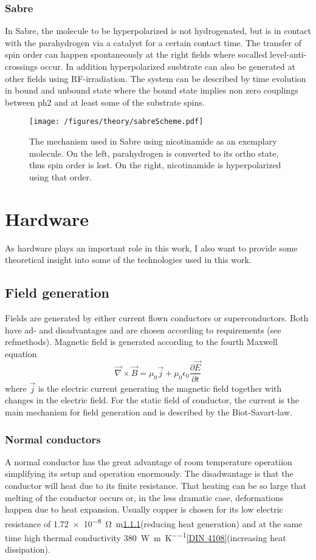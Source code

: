         \subsubsection{Sabre}
        In Sabre, the molecule to be hyperpolarized is not hydrogenated, but is in contact with the parahydrogen via a catalyst for a certain contact time. The transfer of spin order can happen spontaneously at the right fields where socalled level-anti-crossings occur. In addition hyperpolarized susbtrate can also be generated at other fields using RF-irradiation. The system can be described by time evolution in bound and unbound state where the bound state implies non zero couplings between ph2 and at least some of the substrate spins.
        \begin{figure}
            \centering
            \texttt{[image: /figures/theory/sabreScheme.pdf]}
            \caption[Sabre scheme]{The mechanism used in Sabre using nicotinamide as an exemplary molecule. On the left, parahydrogen is converted to its ortho state, thus spin order is lost. On the right, nicotinamide is hyperpolarized using that order.}
        \end{figure}
        \section{Hardware}
            As hardware plays an important role in this work, I also want to provide some theoretical insight into some of the technologies used in this work.
            \subsection{Field generation}
                Fields are generated by either current flown conductors or superconductors. Both have ad- and disadvantages and are chosen according to requirements (see ref{methods}). Magnetic field is generated according to the fourth Maxwell equation
                \begin{equation}
                    \vec\nabla\times\vec B = \mu_0\vec j+\mu_0\epsilon_0\frac{\partial\vec E}{\partial t}
                \end{equation}
                where $\vec j$ is the electric current generating the magnetic field together with changes in the electric field. For the static field of conductor, the current is the main mechanism for field generation and is described by the Biot-Savart-law.
                \subsubsection{Normal conductors}
                A normal conductor has the great advantage of room temperature operatiion simplifying its setup and operation enormously. The disadwantage is that the conductor will heat due to its finite resistance. That heating can be so large that melting of the conductor occurs or, in the less dramatic case, deformations happen due to heat expansion. Usually copper is chosen for its low electric resistance of \SI{1.72e-8}{\ohm\meter}\ref{}(reducing heat generation) and at the same time high thermal conductivity \SI{380}{\watt\per\m\per\kelvin}\ref{DIN 4108}(increasing heat dissipation). 
